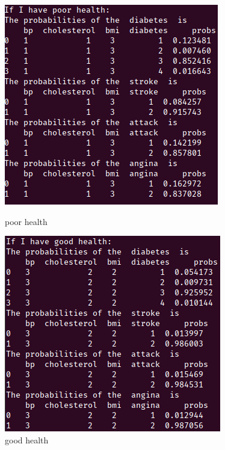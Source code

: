 \documentclass[aps,letterpaper,10pt]{revtex4}
\begin{document}
\begin{figure}[h]
\begin{minipage}[t]{0.5\linewidth}
        \includegraphics[scale=0.45]{4(b)(1).png}
        \caption{poor health}
    \end{minipage}%
    \begin{minipage}[t]{0.5\linewidth}
        \centering
        \includegraphics[scale=0.45]{4(b)(2).png}
        \caption{good health}
    \end{minipage}
\end{figure}
\end{document}
